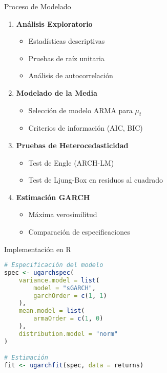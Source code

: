 \begin{frame}{Proceso de Modelado}
    \begin{enumerate}
        \item<1-> \textbf{Análisis Exploratorio}
        \begin{itemize}
            \item Estadísticas descriptivas
            \item Pruebas de raíz unitaria
            \item Análisis de autocorrelación
        \end{itemize}
        
        \item<2-> \textbf{Modelado de la Media}
        \begin{itemize}
            \item Selección de modelo ARMA para $\mu_t$
            \item Criterios de información (AIC, BIC)
        \end{itemize}
        
        \item<3-> \textbf{Pruebas de Heterocedasticidad}
        \begin{itemize}
            \item Test de Engle (ARCH-LM)
            \item Test de Ljung-Box en residuos al cuadrado
        \end{itemize}
        
        \item<4-> \textbf{Estimación GARCH}
        \begin{itemize}
            \item Máxima verosimilitud
            \item Comparación de especificaciones
        \end{itemize}
    \end{enumerate}
\end{frame}

\begin{frame}[fragile]{Implementación en R}
    \begin{lstlisting}[language=R]
# Especificación del modelo
spec <- ugarchspec(
    variance.model = list(
        model = "sGARCH",
        garchOrder = c(1, 1)
    ),
    mean.model = list(
        armaOrder = c(1, 0)
    ),
    distribution.model = "norm"
)

# Estimación
fit <- ugarchfit(spec, data = returns)
    \end{lstlisting}
\end{frame}